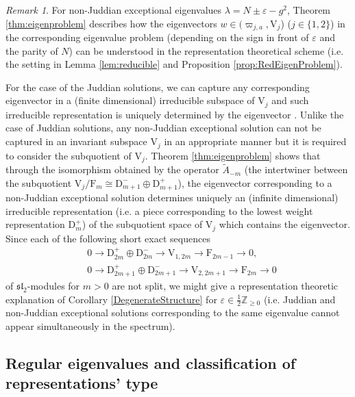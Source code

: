 \documentclass[11pt]{article}
\numberwithin{equation}{section}
\newcommand{\Z}{\mathbb{Z}} %
\newcommand{\e}{\varepsilon}
\newcommand{\RpnSymbol}[1]{\bm{\mathrm{#1}}}
\newcommand{\rF}{\RpnSymbol{F}}
\newcommand{\rV}{\RpnSymbol{V}}
\newcommand{\rD}{\RpnSymbol{D}}
\theoremstyle{plain}
\theoremstyle{definition}
\theoremstyle{remark}
\newtheorem{rem}{Remark}[section]
\begin{document}
\begin{rem}
  For non-Juddian exceptional eigenvalues \(  \lambda = N \pm \e -g^2\), Theorem \ref{thm:eigenproblem} describes how  the eigenvectors
  \(w \in (\varpi_{j,a}, \rV_{j}\)) (\(j \in \{1,2\}\)) in the corresponding eigenvalue problem (depending on the sign in front of \(\e\)
  and the parity of \(N\)) can be understood in the representation theoretical scheme (i.e. the setting in Lemma \ref{lem:reducible} and
  Proposition \ref{prop:RedEigenProblem}).

  For the case of the Juddian solutions, we can capture any corresponding eigenvector in a  (finite dimensional) irreducible subspace of
  $\rV_{j}$ and such irreducible representation is uniquely determined by the eigenvector \cite{W2016JPA}. Unlike the case of Juddian solutions,
  any non-Juddian exceptional solution can not be captured in an invariant subspace  $\rV_{j}$ in an appropriate manner but it is required to
  consider  the subquotient of $\rV_{j}$.  Theorem \ref{thm:eigenproblem} shows that through the isomorphism obtained by the operator
  \(\tilde{A}_{-m}\) (the intertwiner between the subquotient $\rV_{j}/\rF_{m} \cong   \rD^{-}_{m+1}\oplus \rD^{+}_{m+1}$), the eigenvector corresponding
  to a non-Juddian exceptional solution determines uniquely an (infinite dimensional) irreducible representation (i.e. a piece corresponding
  to the lowest weight representation $\rD^{+}_{m}$) of the subquotient space of $\rV_{j}$ which contains the eigenvector.
  Since each of the following short exact sequences%
  \begin{align*}\label{non-split_SES}
    & 0 \longrightarrow  \rD^{+}_{2m}\oplus \rD^{-}_{2m}  \longrightarrow \rV_{1,2m}  \longrightarrow \rF_{2m-1}  \longrightarrow 0,\\
    & 0 \longrightarrow  \rD^{+}_{2m+1}\oplus \rD^{-}_{2m+1}  \longrightarrow \rV_{2,2m+1}  \longrightarrow \rF_{2m}  \longrightarrow 0
  \end{align*}
  of $\mathfrak{sl}_2$-modules for $m>0$ are not split, we might give a representation theoretic explanation of Corollary \ref{DegenerateStructure} for $\e\in\frac12\Z_{\geq0}$ (i.e. Juddian and non-Juddian exceptional solutions  corresponding to the same eigenvalue cannot appear simultaneously in the spectrum).

\subsection{Regular eigenvalues and classification of representations’ type} \label{sec:regular}


\end{rem}
\end{document}
